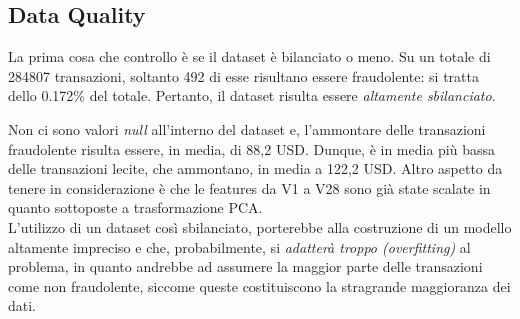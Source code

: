 \documentclass[]{article}
\begin{document}
    \subsection{Data Quality}
        La prima cosa che controllo è se il dataset è bilanciato o meno. Su un totale di 284807 transazioni, soltanto 492 di esse risultano essere fraudolente: si tratta dello 0.172\% del totale. Pertanto, il dataset risulta essere \textit{altamente sbilanciato}.

        Non ci sono valori \textit{null} all'interno del dataset e, l'ammontare delle transazioni fraudolente risulta essere, in media, di 88,2 USD. Dunque, è in media più bassa delle transazioni lecite, che ammontano, in media a 122,2 USD. Altro aspetto da tenere in considerazione è che le features da V1 a V28 sono già state scalate in quanto sottoposte a trasformazione PCA.\\
        L'utilizzo di un dataset così sbilanciato, porterebbe alla costruzione di un modello altamente impreciso e che, probabilmente, si \textit{adatterà troppo (overfitting)} al problema, in quanto andrebbe ad assumere la maggior parte delle transazioni come non fraudolente, siccome queste costituiscono la stragrande maggioranza dei dati.
\end{document}
